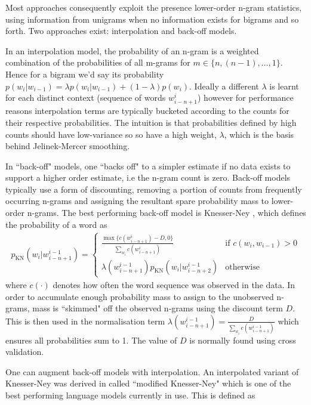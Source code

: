 Most approaches consequently exploit the presence lower-order n-gram statistics, using information from unigrams when no information exists for bigrams and so forth. Two approaches exist: interpolation and back-off models.

In an interpolation model, the probability of an n-gram is a weighted combination of the probabilities of all m-grams for $m \in \{n, (n-1), \ldots, 1\}$. Hence for a bigram we'd say its probability $p(w_i|w_{i-1}) = \lambda p(w_i|w_{i-1}) + (1 - \lambda) p(w_i)$. Ideally a different $\lambda$ is learnt for each distinct context (sequence of words $w^i_{i-n+1}$) however for performance reasons interpolation terms are typically bucketed according to the counts for their respective probabilities. The intuition is that probabilities defined by high counts should have low-variance so so have a high weight, $\lambda$, which is the basis behind Jelinek-Mercer smoothing\cite{JelinekMercer1980}.

In ``back-off" models, one ``backs off" to a simpler estimate if no data exists to support a higher order estimate, i.e the n-gram count is zero. Back-off models typically use a form of discounting, removing a portion of counts from frequently occurring n-grams and assigning the resultant spare probability mass to lower-order n-grams. The best performing back-off model is Knesser-Ney \cite{Chen1999} , which defines the probability of a word as 
\begin{align}
p_\text{KN}(w_i | w^{i-1}_{i-n+1}) = \left\{ \begin{array}{lr}
     \frac{\max\{c(w^i_{i-n+1}) - D, 0\}}{\sum_{w_i} c(w^i_{i-n+1})} & \text{if } c(w_i, w_{i-1}) > 0 \\
     \lambda(w^{i-1}_{i-n+1}) p_\text{KN}(w_i | w^{i-1}_{i-n+2}) & \text{otherwise}
 \end{array}
\right.
\end{align}
where $c(\cdot)$ denotes how often the word sequence was observed in the data. In order to accumulate enough probability mass to assign to the unobserved n-grams, mass is ``skimmed" off the observed n-grams using the discount term $D$. This is then used in the normalisation term $\lambda(w^{i-1}_{i-n+1}) = \frac{D}{\sum_{w_i} c(w^{i-1}_{i-n+1})}$ which ensures all probabilities sum to 1. The value of $D$ is normally found using cross validation.

One can augment back-off models with interpolation. An interpolated variant of Knesser-Ney was derived in\cite{Chen1999} called ``modified Knesser-Ney" which is one of the best performing language models currently in use. This is defined as

